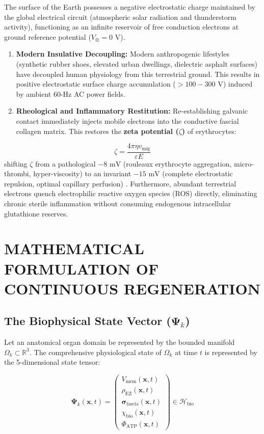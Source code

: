 \documentclass[10pt,twocolumn]{article}
\begin{document}
The surface of the Earth possesses a negative electrostatic charge maintained by the global electrical circuit (atmospheric solar radiation and thunderstorm activity), functioning as an infinite reservoir of free conduction electrons at ground reference potential ($V_{\oplus} = 0\text{ V}$).
\begin{enumerate}
  \item \textbf{Modern Insulative Decoupling:} Modern anthropogenic lifestyles (synthetic rubber shoes, elevated urban dwellings, dielectric asphalt surfaces) have decoupled human physiology from this terrestrial ground. This results in positive electrostatic surface charge accumulation ($> 100 - 300\text{ V}$) induced by ambient 60-Hz AC power fields.
  \item \textbf{Rheological and Inflammatory Restitution:} Re-establishing galvanic contact immediately injects mobile electrons into the conductive fascial collagen matrix. This restores the \textbf{zeta potential ($\zeta$)} of erythrocytes:
\end{enumerate}
\begin{equation}
  \zeta = \frac{4\pi \eta v_{\text{mig}}}{\varepsilon E}
\end{equation}
   shifting $\zeta$ from a pathological $-8\text{ mV}$ (rouleaux erythrocyte aggregation, micro-thrombi, hyper-viscosity) to an invariant $-15\text{ mV}$ (complete electrostatic repulsion, optimal capillary perfusion) \cite{Chevalier2013}. Furthermore, abundant terrestrial electrons quench electrophilic reactive oxygen species (ROS) directly, eliminating chronic sterile inflammation without consuming endogenous intracellular glutathione reserves.



\section{MATHEMATICAL FORMULATION OF CONTINUOUS REGENERATION}


\subsection{The Biophysical State Vector ($\mathbf{\Psi}_k$)}

Let an anatomical organ domain be represented by the bounded manifold $\Omega_k \subset \mathbb{R}^3$. The comprehensive physiological state of $\Omega_k$ at time $t$ is represented by the 5-dimensional state tensor:

\begin{equation}
  \mathbf{\Psi}_k(\mathbf{x}, t) = \begin{pmatrix} V_{\text{mem}}(\mathbf{x}, t) \\ \rho_{\text{EZ}}(\mathbf{x}, t) \\ \boldsymbol{\sigma}_{\text{fascia}}(\mathbf{x}, t) \\ \chi_{\text{bio}}(\mathbf{x}, t) \\ \Phi_{\text{ATP}}(\mathbf{x}, t) \end{pmatrix} \in \mathcal{H}_{\text{bio}}
\end{equation}
\end{document}
